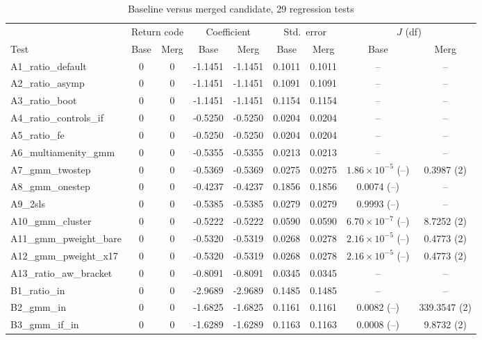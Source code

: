 \begin{table}[htbp]
\centering
\caption{Baseline versus merged candidate, 29 regression tests}
\label{tab:results}
\footnotesize
\setlength{\tabcolsep}{4pt}
\begin{tabular}{l cc cc cc cc}
\toprule
 & \multicolumn{2}{c}{Return code} & \multicolumn{2}{c}{Coefficient}
 & \multicolumn{2}{c}{Std.\ error} & \multicolumn{2}{c}{$J$ (df)} \\
\cmidrule(lr){2-3}\cmidrule(lr){4-5}\cmidrule(lr){6-7}\cmidrule(lr){8-9}
Test & Base & Merg & Base & Merg & Base & Merg & Base & Merg \\
\midrule
A1\_ratio\_default & 0 & 0 & -1.1451 & -1.1451 & 0.1011 & 0.1011 & -- & -- \\
A2\_ratio\_asymp & 0 & 0 & -1.1451 & -1.1451 & 0.1091 & 0.1091 & -- & -- \\
A3\_ratio\_boot & 0 & 0 & -1.1451 & -1.1451 & 0.1154 & 0.1154 & -- & -- \\
A4\_ratio\_controls\_if & 0 & 0 & -0.5250 & -0.5250 & 0.0204 & 0.0204 & -- & -- \\
A5\_ratio\_fe & 0 & 0 & -0.5250 & -0.5250 & 0.0204 & 0.0204 & -- & -- \\
A6\_multiamenity\_gmm & 0 & 0 & -0.5355 & -0.5355 & 0.0213 & 0.0213 & -- & -- \\
A7\_gmm\_twostep & 0 & 0 & -0.5369 & -0.5369 & 0.0275 & 0.0275 & $1.86\times 10^{-5}$ (--) & 0.3987 (2) \\
A8\_gmm\_onestep & 0 & 0 & -0.4237 & -0.4237 & 0.1856 & 0.1856 & 0.0074 (--) & -- \\
A9\_2sls & 0 & 0 & -0.5385 & -0.5385 & 0.0279 & 0.0279 & 0.9993 (--) & -- \\
A10\_gmm\_cluster & 0 & 0 & -0.5222 & -0.5222 & 0.0590 & 0.0590 & $6.70\times 10^{-7}$ (--) & 8.7252 (2) \\
A11\_gmm\_pweight\_bare & 0 & 0 & -0.5320 & -0.5319 & 0.0268 & 0.0278 & $2.16\times 10^{-5}$ (--) & 0.4773 (2) \\
A12\_gmm\_pweight\_x17 & 0 & 0 & -0.5320 & -0.5319 & 0.0268 & 0.0278 & $2.16\times 10^{-5}$ (--) & 0.4773 (2) \\
A13\_ratio\_aw\_bracket & 0 & 0 & -0.8091 & -0.8091 & 0.0345 & 0.0345 & -- & -- \\
B1\_ratio\_in & 0 & 0 & -2.9689 & -2.9689 & 0.1485 & 0.1485 & -- & -- \\
B2\_gmm\_in & 0 & 0 & -1.6825 & -1.6825 & 0.1161 & 0.1161 & 0.0082 (--) & 339.3547 (2) \\
B3\_gmm\_if\_in & 0 & 0 & -1.6289 & -1.6289 & 0.1163 & 0.1163 & 0.0008 (--) & 9.8732 (2) \\

\end{tabular}
\end{table}
